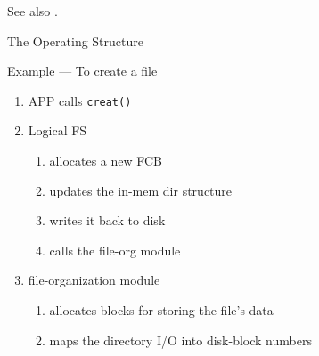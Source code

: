 See also .

\begin{frame}{The Operating Structure}
  \begin{minipage}{.25\textwidth}
  \end{minipage}\quad
  \begin{minipage}{.7\textwidth}
    \begin{block}{Example --- To create a file}
      \begin{enumerate}
      \item \alert{APP} calls \texttt{creat()}
      \item \alert{Logical FS}
        \begin{enumerate}
        \item allocates a new FCB
        \item updates the in-mem dir structure %
        \item writes it back to disk
        \item calls the file-org module
        \end{enumerate}
      \item \alert{file-organization module}
        \begin{enumerate}
        \item allocates blocks for storing the file's data
        \item maps the directory I/O into disk-block numbers
        \end{enumerate}

\end{enumerate}
\end{block}
\end{minipage}
\end{frame}
